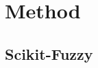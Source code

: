 \chapter{Method}
\section{Scikit-Fuzzy}
\cite{josh_warner_2017_1002946}
\cite{perera2012intelligent}